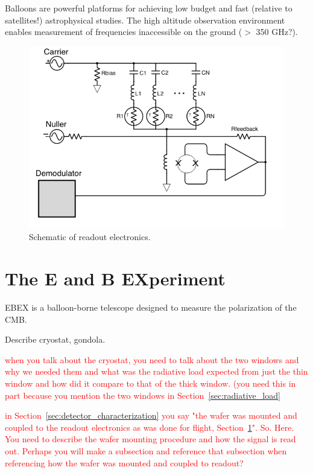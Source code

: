 Balloons are powerful platforms for achieving low budget and fast (relative to satellites!) astrophysical studies. The high altitude observation environment enables measurement of frequencies inaccessible on the ground ($>$ 350 GHz?). 

\begin{figure}[htbp]
\begin{center}
\includegraphics[width=0.6\columnwidth]{figures/dfmux_schematic.png}
\caption{Schematic of readout electronics. 
\label{fig:dfmux} }
\end{center}
\end{figure}






\section{The E and B EXperiment}
\label{sec:ebex}

\ac{EBEX} is a balloon-borne telescope designed to measure the polarization of the \ac{CMB}.
 
Describe cryostat, gondola.  

\textcolor{red}{when you talk about the cryostat, you need to talk about the two windows and why we needed them and what was the radiative load expected from just the thin window and how did it compare to that of the thick window. (you need this in part because you mention the two windows in Section~\ref{sec:radiative_load}}

\textcolor{red}{in Section~\ref{sec:detector_characterization} you say "the wafer was mounted and coupled to the readout electronics as was done for flight, Section~\ref{sec:ebex}". 
So. 
Here. You need to describe the wafer mounting procedure and how the signal is read out. 
Perhaps you will make a subsection and reference that subsection when referencing how the wafer was mounted and coupled to readout?}
 
